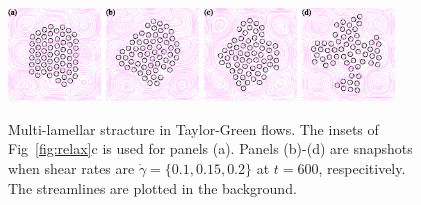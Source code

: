 \documentclass[aps,prl,preprint,groupedaddress]{revtex4-2}
\begin{document}
\begin{figure}
  \begin{center}
  \includegraphics[width=0.22\textwidth]{MTG_0.pdf}
  \includegraphics[width=0.22\textwidth]{MTG_1.pdf}
  \includegraphics[width=0.22\textwidth]{MTG_2.pdf} 
    \includegraphics[width=0.22\textwidth]{MTG_3.pdf} 
  \end{center}
  \vspace{-20pt}  
  \caption{\label{fig:BC2_TG_flow} Multi-lamellar stracture in Taylor-Green flows. The insets of Fig~\ref{fig:relax}c is used for panels (a). Panels (b)-(d) are snapshots when shear rates are $\dot\gamma=\{0.1, 0.15, 0.2\}$ at $t=600$, respecitively. The streamlines are plotted in the background. }
\end{figure}
\end{document}
